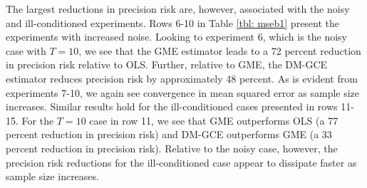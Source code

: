 \documentclass{elsarticle}
\begin{document}
\footnotesize
{}
\normalsize

The largest reductions in precision risk are, however, associated with the noisy
and ill-conditioned experiments.
Rows 6-10 in Table \ref{tbl: mseb1} present the experiments with increased 
noise. 
Looking to experiment 6, which is the noisy case with $T=10$, we see that 
the GME estimator leads to a 72 percent reduction in precision risk relative 
to OLS.
Further, relative to GME, the DM-GCE estimator reduces precision risk by 
approximately 48 percent. 
As is evident from experiments 7-10, we again see convergence in mean 
squared error as sample size increases.
Similar results hold for the ill-conditioned cases presented in rows 11-15.
For the $T=10$ case in row 11, we see that GME outperforms OLS 
(a 77 percent reduction in precision risk) and DM-GCE outperforms GME 
(a 33 percent reduction in precision risk).
Relative to the noisy case, however, the precision risk reductions for the 
ill-conditioned case appear to dissipate faster as sample size increases.
\end{document}
